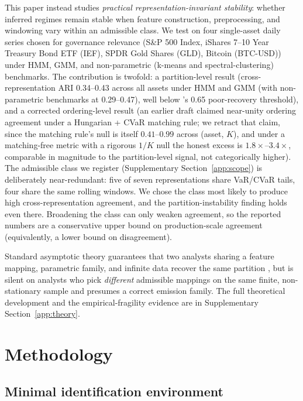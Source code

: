\documentclass[preprint,12pt,authoryear]{elsarticle}
\newcommand{\BTC}{Bitcoin (BTC-USD)}
\newcommand{\GLD}{SPDR Gold Shares (GLD)}
\newcommand{\SPX}{S\&P 500 Index}
\newcommand{\IEF}{iShares 7--10 Year Treasury Bond ETF (IEF)}
\begin{document}
This paper instead studies \emph{practical representation-invariant stability}: whether inferred regimes remain stable when feature construction, preprocessing, and windowing vary within an admissible class. We test on four single-asset daily series chosen for governance relevance (\SPX{}, \IEF{}, \GLD{}, \BTC{}) under HMM, GMM, and non-parametric (k-means and spectral-clustering) benchmarks. The contribution is twofold: a partition-level result (cross-representation ARI 0.34--0.43 across all assets under HMM and GMM (with non-parametric benchmarks at 0.29--0.47), well below \citet{Steinley2004}'s 0.65 poor-recovery threshold), and a corrected ordering-level result (an earlier draft claimed near-unity ordering agreement under a Hungarian + CVaR matching rule; we retract that claim, since the matching rule's null is itself $0.41$--$0.99$ across (asset, $K$), and under a matching-free metric with a rigorous $1/K$ null the honest excess is $1.8\times$--$3.4\times$, comparable in magnitude to the partition-level signal, not categorically higher). The admissible class we register (Supplementary Section~\ref{app:scope}) is deliberately near-redundant: five of seven representations share VaR/CVaR tails, four share the same rolling windows. We chose the class most likely to produce high cross-representation agreement, and the partition-instability finding holds even there. Broadening the class can only weaken agreement, so the reported numbers are a conservative upper bound on production-scale agreement (equivalently, a lower bound on disagreement).

Standard asymptotic theory guarantees that two analysts sharing a feature mapping, parametric family, and infinite data recover the same partition \citep{Teicher1963,Hamilton1989,Guidolin2011}, but is silent on analysts who pick \emph{different} admissible mappings on the same finite, non-stationary sample and presumes a correct emission family. The full theoretical development and the empirical-fragility evidence \citep{DanielssonJamesValenzuelaZer2016} are in Supplementary Section~\ref{app:theory}.

\section{Methodology}

\subsection{Minimal identification environment}
\end{document}
